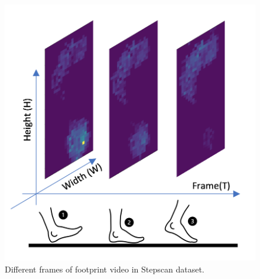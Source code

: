 \begin{figure}
    \centering
    \begin{minipage}[b]{.5\textwidth}
        \includegraphics[width=\textwidth]{figures/project/frame2.png}
    \end{minipage}
    \caption{Different frames of footprint video in Stepscan dataset.}
    \label{fig:Stepscan_dataset}
\end{figure}


